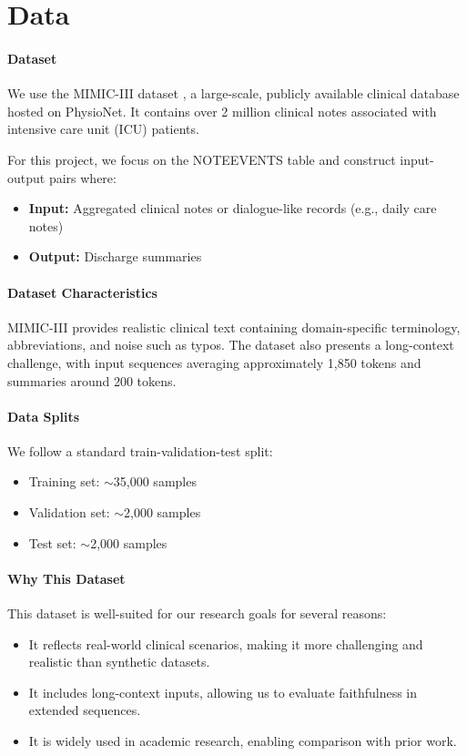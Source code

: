 \documentclass[11pt]{article}
\begin{document}
\section{Data}

\paragraph{Dataset}
We use the MIMIC-III dataset \cite{johnson2016mimic}, a large-scale, publicly available clinical database hosted on PhysioNet. It contains over 2 million clinical notes associated with intensive care unit (ICU) patients.

For this project, we focus on the NOTEEVENTS table and construct input-output pairs where:
\begin{itemize}
    \item \textbf{Input:} Aggregated clinical notes or dialogue-like records (e.g., daily care notes)
    \item \textbf{Output:} Discharge summaries
\end{itemize}

\paragraph{Dataset Characteristics}
MIMIC-III provides realistic clinical text containing domain-specific terminology, abbreviations, and noise such as typos. The dataset also presents a long-context challenge, with input sequences averaging approximately 1,850 tokens and summaries around 200 tokens.

\paragraph{Data Splits}
We follow a standard train-validation-test split:
\begin{itemize}
    \item Training set: $\sim$35,000 samples
    \item Validation set: $\sim$2,000 samples
    \item Test set: $\sim$2,000 samples
\end{itemize}

\paragraph{Why This Dataset}
This dataset is well-suited for our research goals for several reasons:
\begin{itemize}
    \item It reflects real-world clinical scenarios, making it more challenging and realistic than synthetic datasets.
    \item It includes long-context inputs, allowing us to evaluate faithfulness in extended sequences.
    \item It is widely used in academic research, enabling comparison with prior work.
\end{itemize}
\end{document}
